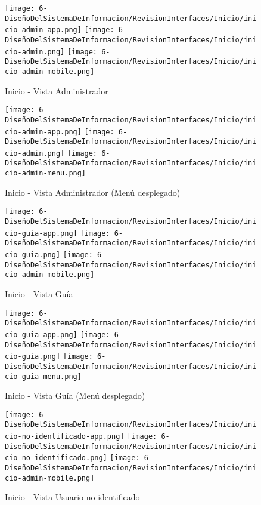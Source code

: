 \begin{figure}[H]
	\centering
	\texttt{[image: 6-DiseñoDelSistemaDeInformacion/RevisionInterfaces/Inicio/inicio-admin-app.png]}
	\texttt{[image: 6-DiseñoDelSistemaDeInformacion/RevisionInterfaces/Inicio/inicio-admin.png]}
	\texttt{[image: 6-DiseñoDelSistemaDeInformacion/RevisionInterfaces/Inicio/inicio-admin-mobile.png]}
	\caption{Inicio - Vista Administrador }
\end{figure}

\begin{figure}[H]
	\centering
	\texttt{[image: 6-DiseñoDelSistemaDeInformacion/RevisionInterfaces/Inicio/inicio-admin-app.png]}
	\texttt{[image: 6-DiseñoDelSistemaDeInformacion/RevisionInterfaces/Inicio/inicio-admin.png]}
	\texttt{[image: 6-DiseñoDelSistemaDeInformacion/RevisionInterfaces/Inicio/inicio-admin-menu.png]}
	\caption{Inicio - Vista Administrador (Menú desplegado)}
\end{figure}

\begin{figure}[H]
	\centering
	\texttt{[image: 6-DiseñoDelSistemaDeInformacion/RevisionInterfaces/Inicio/inicio-guia-app.png]}
	\texttt{[image: 6-DiseñoDelSistemaDeInformacion/RevisionInterfaces/Inicio/inicio-guia.png]}
	\texttt{[image: 6-DiseñoDelSistemaDeInformacion/RevisionInterfaces/Inicio/inicio-admin-mobile.png]}
	\caption{Inicio - Vista Guía }
\end{figure}

\begin{figure}[H]
	\centering
	\texttt{[image: 6-DiseñoDelSistemaDeInformacion/RevisionInterfaces/Inicio/inicio-guia-app.png]}
	\texttt{[image: 6-DiseñoDelSistemaDeInformacion/RevisionInterfaces/Inicio/inicio-guia.png]}
	\texttt{[image: 6-DiseñoDelSistemaDeInformacion/RevisionInterfaces/Inicio/inicio-guia-menu.png]}
	\caption{Inicio - Vista Guía (Menú desplegado)}
\end{figure}

\begin{figure}[H]
	\centering
	\texttt{[image: 6-DiseñoDelSistemaDeInformacion/RevisionInterfaces/Inicio/inicio-no-identificado-app.png]}
	\texttt{[image: 6-DiseñoDelSistemaDeInformacion/RevisionInterfaces/Inicio/inicio-no-identificado.png]}
	\texttt{[image: 6-DiseñoDelSistemaDeInformacion/RevisionInterfaces/Inicio/inicio-admin-mobile.png]}
	\caption{Inicio - Vista Usuario no identificado }
\end{figure}

